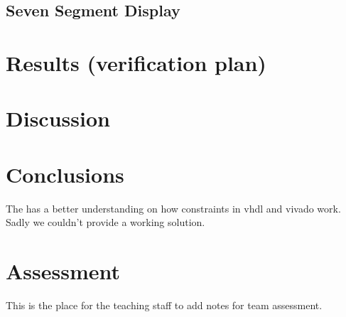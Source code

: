 \documentclass[%
	a4paper,
]
{article}
\begin{document}
\subsection{Seven Segment Display}

%
%
\section{Results (verification plan)}
\label{sec:results}




%
%
\section{Discussion}
\label{sec:discussion}


%
%
\section{Conclusions}
\label{sec:conclusions}

The has a better understanding on how constraints in vhdl and vivado work. 
Sadly we couldn't provide a working solution.
%
%
\pagebreak
\section{Assessment}
\label{sec:assessment}

This is the place for the teaching staff to add notes for team assessment.
\end{document}
